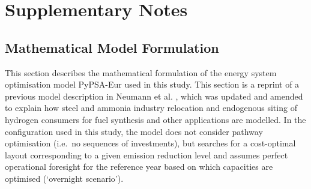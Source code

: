 
\section{Supplementary Notes}

\subsection{Mathematical Model Formulation}
\label{sec:si:math}

This section describes the mathematical formulation of the energy system
optimisation model PyPSA-Eur used in this study. This section is a reprint of a
previous model description in Neumann et al.
\cite{neumannPotentialRoleHydrogen2023}, which was updated and amended to
explain how steel and ammonia industry relocation and endogenous siting of
hydrogen consumers for fuel synthesis and other applications are modelled. In
the configuration used in this study, the model does not consider pathway
optimisation (i.e.~no sequences of investments), but searches for a cost-optimal
layout corresponding to a given \co emission reduction level and assumes perfect
operational foresight for the reference year based on which capacities are
optimised (`overnight scenario').

